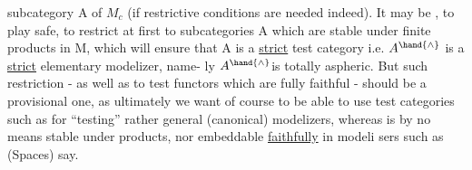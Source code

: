 subcategory A of $M_c$  (if restrictive conditions are needed indeed).  It
may be  ,  to play safe,  to restrict at first to subcategories A
which are stable under finite products in M,  which will ensure that A is
a \uline{strict}  test category  i.e.  $A^{\hand{\wedge}}$ is a \uline{strict} elementary modelizer,  name-%
ly $A^{\hand{\wedge}}$is totally aspheric.  But such restriction  -  as well as to test
functors which are fully faithful  -  should be a provisional one,  as
ultimately we want of course to be able to use test categories such as
\hand{$\Delta$} for ``testing'' rather general (canonical) modelizers,  whereas \hand{$\Delta$} is
by no means stable under products,  nor embeddable \uline{faithfully} in modeli%
sers such as (Spaces) say.

